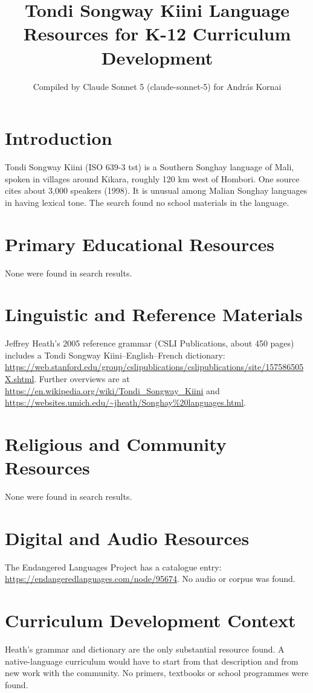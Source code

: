 \documentclass[12pt]{article}
\title{Tondi Songway Kiini Language Resources for K-12 Curriculum Development}
\author{Compiled by Claude Sonnet 5 (claude-sonnet-5) for Andr\'as Kornai}
\date{}
\begin{document}
\maketitle
\section{Introduction}
Tondi Songway Kiini (ISO 639-3 tst) is a Southern Songhay language of Mali, spoken in villages around Kikara, roughly 120 km west of Hombori. One source cites about 3,000 speakers (1998). It is unusual among Malian Songhay languages in having lexical tone. The search found no school materials in the language.
\section{Primary Educational Resources}
None were found in search results.
\section{Linguistic and Reference Materials}
Jeffrey Heath's 2005 reference grammar (CSLI Publications, about 450 pages) includes a Tondi Songway Kiini--English--French dictionary: \url{https://web.stanford.edu/group/cslipublications/cslipublications/site/157586505X.shtml}. Further overviews are at \url{https://en.wikipedia.org/wiki/Tondi_Songway_Kiini} and \url{https://websites.umich.edu/~jheath/Songhay%20languages.html}.
\section{Religious and Community Resources}
None were found in search results.
\section{Digital and Audio Resources}
The Endangered Languages Project has a catalogue entry: \url{https://endangeredlanguages.com/node/95674}. No audio or corpus was found.
\section{Curriculum Development Context}
Heath's grammar and dictionary are the only substantial resource found. A native-language curriculum would have to start from that description and from new work with the community. No primers, textbooks or school programmes were found.
\end{document}
